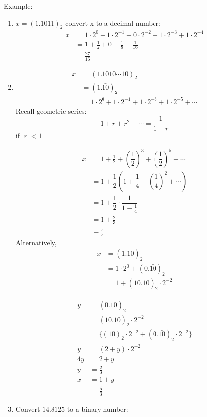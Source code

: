 \documentclass[10pt]{article}
\theoremstyle{definition}
\begin{document}
   Example:
   \begin{enumerate}
   \item $x = (1.1011)_2$ convert x to a decimal number:\begin{align*}
   x&=1\cdot 2^0+1\cdot 2^{-1} + 0 \cdot 2^{-2}+1\cdot 2^{-3}+1\cdot 2^{-4}\\
   &= 1+\frac{1}{2}+0+\frac{1}{8}+\frac{1}{16}\\
   &=\frac{27}{16}
   \end{align*}
   \item
   \begin{align*}
   x &= (1.1010 \cdots 10)_2\\
   &= (1.\bar{10})_2\\
   &=1\cdot 2^0+1\cdot 2^{-1} +1\cdot 2^{-3}+1\cdot 2^{-5}+\cdots
   \end{align*}
   Recall geometric series:\[1+r+r^2+\cdots = \frac{1}{1-r}\] if $|r| < 1$
   
   \begin{align*}
   x &= 1+\frac{1}{2}+\left(\dfrac{1}{2}\right)^3+\left(\dfrac{1}{2}\right)^5+\cdots\\
   &=1+\dfrac{1}{2}\left(1+\dfrac{1}{4}+\left(\dfrac{1}{4}\right)^2+\cdots\right)\\
   &=1+\dfrac{1}{2}\cdot \dfrac{1}{1-\frac{1}{4}}\\
   &=1+\frac{2}{3}\\
   &=\frac{5}{3}
   \end{align*}
   Alternatively, \begin{align*}
   x &=(1.\bar{10})_2\\
   &=1\cdot 2^0+(0.\bar{10})_2\\
   &=1+(10.\bar{10})_2\cdot  2^{-2}
   \end{align*}
   
   \begin{align*}
    y &=(0.\bar{10})_2\\
    &=(10.\bar{10})_2 \cdot 2^{-2}\\
    &=\{(10)_2\cdot 2^{-2}+(0.\bar{10})_2\cdot  2^{-2}\}\\
    y&=(2+y)\cdot 2^{-2}\\
    4y&=2+y\\
    y&=\frac{2}{3}\\
    x&=1+y\\
    &=\frac{5}{3}
   \end{align*}
   \item Convert $14.8125$ to a binary number:
   

\end{enumerate}
\end{document}
